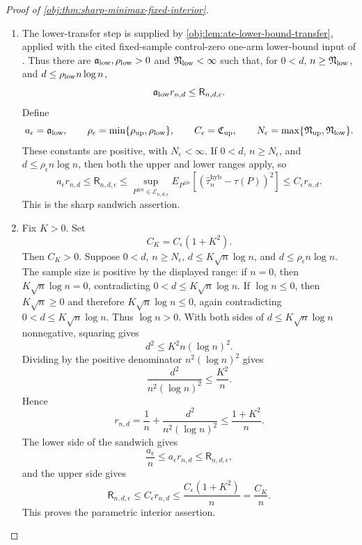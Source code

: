 \documentclass[11pt]{article}
\begin{document}
\begin{proof}[Proof of \cref{obj:thm:sharp-minimax-fixed-interior}]
\begin{enumerate}
\item The lower-transfer step is supplied by \cref{obj:lem:ate-lower-bound-transfer}, applied with the cited fixed-sample control-zero one-arm lower-bound input of \citet{ZengBalakrishnanHanKennedy2024}.  Thus there are
\(\mathfrak a_{\rm low},\mathfrak\rho_{\rm low}>0\) and
\(\mathfrak N_{\rm low}<\infty\) such that, for \(0<d\),
\(n\ge\mathfrak N_{\rm low}\), and
\(d\le \mathfrak\rho_{\rm low}n\log n\),
\[
\mathfrak a_{\rm low} r_{n,d}\le \mathsf R_{n,d,\epsilon}.
\]
Define
\[
a_\epsilon=\mathfrak a_{\rm low},\qquad
\rho_\epsilon=\min\{\mathfrak\rho_{\rm up},\mathfrak\rho_{\rm low}\},\qquad
C_\epsilon=\mathfrak C_{\rm up},\qquad
N_\epsilon=\max\{\mathfrak N_{\rm up},\mathfrak N_{\rm low}\}.
\]
These constants are positive, with \(N_\epsilon<\infty\).  If \(0<d\),
\(n\ge N_\epsilon\), and \(d\le\rho_\epsilon n\log n\), then both the upper and lower
ranges apply, so
\[
a_\epsilon r_{n,d}
\le
\mathsf R_{n,d,\epsilon}
\le
\sup_{P^{\otimes n}\in\mathcal E_{n,d,\epsilon}}
E_{P^{\otimes n}}\!\left[
\left(\widehat\tau_n^{\mathrm{hyb}}-\tau(P)\right)^2
\right]
\le
C_\epsilon r_{n,d}.
\]
This is the sharp sandwich assertion.

\item Fix \(K>0\).  Set
\[
C_K=C_\epsilon(1+K^2).
\]
Then \(C_K>0\).  Suppose \(0<d\), \(n\ge N_\epsilon\),
\(d\le K\sqrt n\log n\), and \(d\le\rho_\epsilon n\log n\).  The sample size is positive by the displayed range: if \(n=0\), then \(K\sqrt n\log n=0\), contradicting \(0<d\le K\sqrt n\log n\).  If \(\log n\le0\), then
\(K\sqrt n\ge0\) and therefore \(K\sqrt n\log n\le0\), again contradicting
\(0<d\le K\sqrt n\log n\).  Thus \(\log n>0\).
With both sides of \(d\le K\sqrt n\log n\) nonnegative, squaring gives
\[
d^2\le K^2 n(\log n)^2.
\]
Dividing by the positive denominator \(n^2(\log n)^2\) gives
\[
\frac{d^2}{n^2(\log n)^2}\le \frac{K^2}{n}.
\]
Hence
\[
r_{n,d}
=
\frac1n+\frac{d^2}{n^2(\log n)^2}
\le
\frac{1+K^2}{n}.
\]
The lower side of the sandwich gives
\[
\frac{a_\epsilon}{n}
\le
a_\epsilon r_{n,d}
\le
\mathsf R_{n,d,\epsilon},
\]
and the upper side gives
\[
\mathsf R_{n,d,\epsilon}
\le
C_\epsilon r_{n,d}
\le
\frac{C_\epsilon(1+K^2)}{n}
=
\frac{C_K}{n}.
\]
This proves the parametric interior assertion.


\end{enumerate}
\end{proof}
\end{document}
